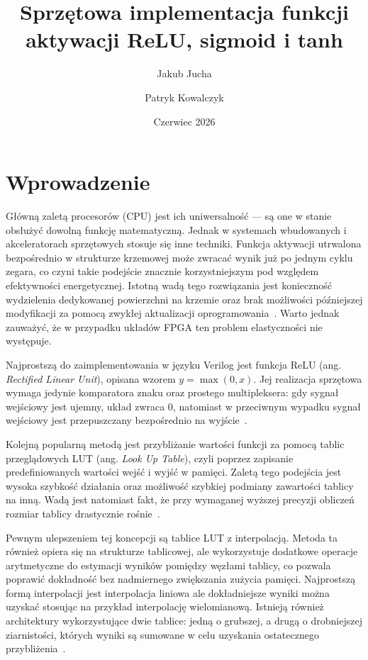 \documentclass[12pt, a4paper, oneside]{scrreprt}
\title{Sprzętowa implementacja funkcji aktywacji ReLU, sigmoid i tanh}
\author{Jakub Jucha \and Patryk Kowalczyk}
\date{Czerwiec 2026}
\begin{document}
\maketitle

\tableofcontents %
\newpage

\chapter{Wprowadzenie}

Główną zaletą procesorów (CPU) jest ich uniwersalność — są one w stanie obsłużyć dowolną funkcję matematyczną.
Jednak w systemach wbudowanych i akceleratorach sprzętowych stosuje się inne techniki.
Funkcja aktywacji utrwalona bezpośrednio w strukturze krzemowej może zwracać wynik już po jednym cyklu zegara,
co czyni takie podejście znacznie korzystniejszym pod względem efektywności energetycznej.
Istotną wadą tego rozwiązania jest konieczność wydzielenia dedykowanej powierzchni na krzemie oraz
brak możliwości późniejszej modyfikacji za pomocą zwykłej aktualizacji oprogramowania~\cite{semiengineering}.
Warto jednak zauważyć, że w przypadku układów FPGA ten problem elastyczności nie występuje.

Najprostszą do zaimplementowania w języku Verilog jest funkcja ReLU (ang. \textit{Rectified Linear Unit}),
opisana wzorem $y = \max(0,x)$. Jej realizacja sprzętowa wymaga jedynie komparatora znaku oraz prostego
multipleksera: gdy sygnał wejściowy jest ujemny, układ zwraca 0, natomiast w przeciwnym wypadku sygnał
wejściowy jest przepuszczany bezpośrednio na wyjście~\cite{semiengineering}.

Kolejną popularną metodą jest przybliżanie wartości funkcji za pomocą tablic przeglądowych LUT (ang. \textit{Look Up Table}), czyli poprzez zapisanie predefiniowanych wartości wejść i wyjść w pamięci. Zaletą tego podejścia jest wysoka szybkość działania oraz możliwość szybkiej podmiany zawartości tablicy na inną. Wadą jest natomiast fakt, że przy wymaganej wyższej precyzji obliczeń rozmiar tablicy drastycznie rośnie~\cite{semiengineering}. 

Pewnym ulepszeniem tej koncepcji są tablice LUT z interpolacją. Metoda ta również opiera się
na strukturze tablicowej, ale wykorzystuje dodatkowe operacje arytmetyczne do estymacji wyników
pomiędzy węzłami tablicy, co pozwala poprawić dokładność bez nadmiernego zwiększania zużycia pamięci.
Najprostszą formą interpolacji jest interpolacja liniowa ale dokładniejsze wyniki można uzyskać
stosując na przykład interpolację wielomianową. Istnieją również architektury wykorzystujące
dwie tablice: jedną o grubszej, a drugą o drobniejszej ziarnistości, których wyniki są sumowane
w celu uzyskania ostatecznego przybliżenia~\cite{thedatabus}.
\end{document}
